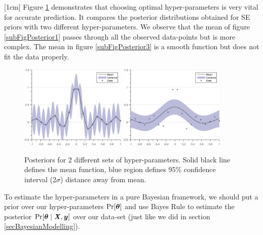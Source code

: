 [1cm]
Figure \ref{figGPRMarginal} demonstrates that choosing optimal hyper-parameters is very vital for accurate prediction. It compares the posterior distributions obtained for SE priors with two different hyper-parameters. We observe that the mean of figure \ref{subFigPosterior1} passes through all the observed data-points but is more complex. The mean in figure \ref{subFigPosterior3} is a smooth function but does not fit the data properly. 

  \begin{figure}[!ht]
  \centering
    \subfigure[{Posterior between SE prior with hyper-parameters $(\VEC{\theta} = [0.35, 0.05]; \sigma_{noise} = 0.01)$ and data. }]
  {
        \includegraphics[width=0.45\textwidth]
        {images/part1/posteriorSE1}
        \label{subFigPosterior1}
  }\quad
\subfigure[{Posterior between SE prior with hyper-parameters $(\VEC{\theta} = [0.35, 0.5]; \sigma_{noise} = 0.01)$ and data. }]
  {
        \includegraphics[width=0.45\textwidth]
        {images/part1/posteriorSE3}
        \label{subFigPosterior3}
  }\quad
       \caption{Posteriors for 2 different sets of hyper-parameters. Solid black line defines the mean function, blue region defines 95\% confidence interval (2$\sigma$) distance away from mean. }\label{figGPRMarginal}
\end{figure}

To estimate the hyper-parameters in a pure Bayesian framework, we should put a prior over our hyper-parameters $\Pr[\boldsymbol{\theta}]$ and use Bayes Rule to estimate the posterior $\Pr[\boldsymbol{\theta} \mid \bm{\mathit{X}}, \boldsymbol{y}]$ over our data-set (just like we did in section \ref{secBayesianModelling}). 

